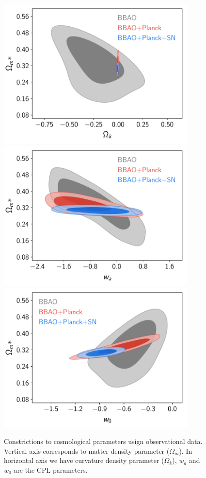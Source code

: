\documentclass[onecolumn,           %
               showpacs,            %
               preprintnumbers,     %
               aps,                 %
               prl,          	    %
               letterpaper,             %
               superscriptaddress,      %
               nofootinbib,         %
               tightenlines,        %
               floats,floatfix      %
               ,usenatbib,
               ]{revtex4-1}
\begin{document}
\begin{figure}[h]
	\centering
	\includegraphics[width=10cm]{FiguresCosmo/Ok_Om_owaCDM_todos.pdf}	
	\includegraphics[width=10cm]{FiguresCosmo/wa_Om_owaCDM_todos.pdf}
	\includegraphics[width=10cm]{FiguresCosmo/w_Om_owaCDM_todos}
	\caption{Constrictions to cosmological parameters usign observational data. Vertical axis corresponds to matter density parameter ($\Omega_m$). In horizontal axis we have curvature density parameter ($\Omega_k$), $w_a$ and $w_0$ are the CPL parameters.}
	\label{cosmo1}
\end{figure}
\end{document}
